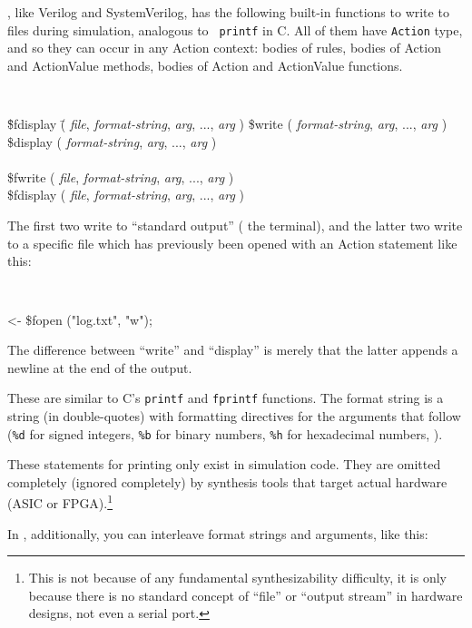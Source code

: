 {\BSV}, like Verilog and SystemVerilog, has the following built-in
functions to write to files during simulation, analogous to {\tt
printf} in C. All of them have {\tt Action} type, and so they can
occur in any Action context: bodies of rules, bodies of Action and
ActionValue methods, bodies of Action and ActionValue functions.

{\tt
\begin{tabbing}
\hmmm\= \$fdisplay \= ( {\it file}, \= {\it format-string}, {\it arg}, ..., {\it arg} ) \kill
     \> \$write    \> (             \> {\it format-string}, {\it arg}, ..., {\it arg} ) \\
     \> \$display  \> (             \> {\it format-string}, {\it arg}, ..., {\it arg} ) \\
\\
     \> \$fwrite   \> ( {\it file}, \> {\it format-string}, {\it arg}, ..., {\it arg} ) \\
     \> \$fdisplay \> ( {\it file}, \= {\it format-string}, {\it arg}, ..., {\it arg} )
\end{tabbing}
}

The first two write to ``standard output'' ({\ie} the terminal), and
the latter two write to a specific file which has previously been
opened with an Action statement like this:

{\tt
\begin{tabbing}
 <- \$fopen ("log.txt", "w");
\end{tabbing}
}

The difference between ``write'' and ``display'' is merely that the
latter appends a newline at the end of the output.

These are similar to C's \verb|printf| and \verb|fprintf| functions.
The format string is a string (in double-quotes) with formatting
directives for the arguments that follow (\verb|%d| for signed
integers, \verb|%b| for binary numbers, \verb|%h| for hexadecimal
numbers, {\etc}).

These {\BSV} statements for printing only exist in simulation code.
They are omitted completely (ignored completely) by synthesis tools
that target actual hardware (ASIC or FPGA).\footnote{This is not
because of any fundamental synthesizability difficulty, it is only
because there is no standard concept of ``file'' or ``output stream''
in hardware designs, not even a serial port.}

In {\BSV}, additionally, you can interleave format strings and arguments, like this:

